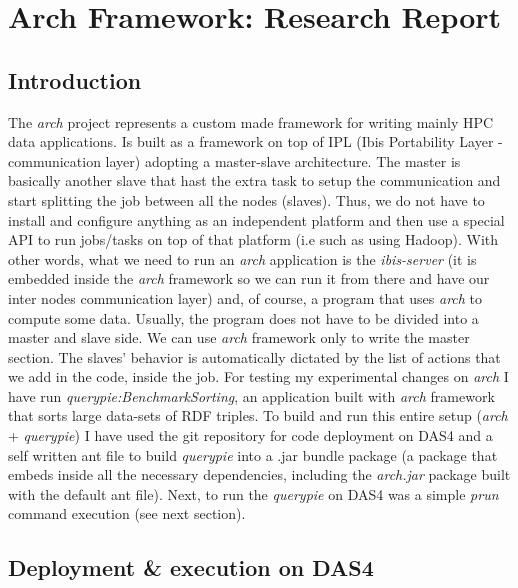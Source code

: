 \section{Arch Framework: Research Report}

\subsection{Introduction}

The \textit{arch} project represents a custom made framework for writing mainly HPC data applications. Is built as a framework on top of IPL (Ibis Portability Layer - communication layer) adopting a master-slave architecture. The master is basically another slave that hast the extra task to setup the communication and start splitting the job between all the nodes (slaves). Thus, we do not have to install and configure anything as an independent platform and then use a special API to run jobs/tasks on top of that platform (i.e such as using Hadoop). With other words, what we need to run an \textit{arch} application is the \textit{ibis-server} (it is embedded inside the \textit{arch} framework so we can run it from there and have our inter nodes communication layer) and, of course, a program that uses \textit{arch} to compute some data. Usually, the program does not have to be divided into a master and slave side. We can use \textit{arch} framework only to write the master section. The slaves' behavior is automatically dictated by the list of actions that we add in the code, inside the job. For testing my experimental changes on \textit{arch} I have run \textit{querypie:BenchmarkSorting}, an application built with \textit{arch} framework that sorts large data-sets of RDF triples. To build and run this entire setup (\textit{arch} + \textit{querypie}) I have used the git repository for code deployment on DAS4 and a self written ant file \cite{build_file} to build \textit{querypie} into a .jar bundle package (a package that embeds inside all the necessary dependencies, including the \textit{arch.jar} package built with the default ant file). Next, to run the \textit{querypie} on DAS4 was a simple \textit{prun} command execution (see next section).

% 
\subsection{Deployment \& execution on DAS4}

